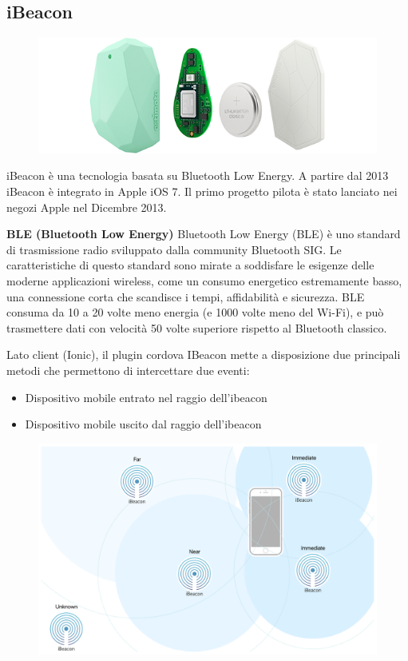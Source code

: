 \subsection{iBeacon}

\begin{figure}[H]
    \centering  
    \includegraphics[scale=0.3]{img/cap2/beacon}
\end{figure}

iBeacon è una tecnologia basata su Bluetooth Low Energy. A partire dal 2013 iBeacon è 
integrato in Apple iOS 7. Il primo progetto pilota è stato lanciato nei negozi Apple nel
Dicembre 2013.

\textbf{BLE (Bluetooth Low Energy)}
Bluetooth Low Energy (BLE) è uno standard di trasmissione radio sviluppato dalla community 
Bluetooth SIG. Le caratteristiche di questo standard sono mirate a soddisfare le esigenze
delle moderne applicazioni wireless, come un consumo energetico estremamente basso, una
connessione corta che scandisce i tempi, affidabilità e sicurezza. 
BLE consuma da 10 a 20 volte meno energia (e 1000 volte meno del Wi-Fi), e può trasmettere
dati con velocità 50 volte superiore rispetto al Bluetooth classico. 

Lato client (Ionic), il plugin cordova IBeacon mette a disposizione due principali metodi
che permettono di intercettare due eventi:

\begin{itemize}
    \item Dispositivo mobile entrato nel raggio dell'ibeacon
    \item Dispositivo mobile uscito dal raggio dell'ibeacon
\end{itemize}

\begin{figure}[H]
    \centering  
    \includegraphics[scale=0.3]{img/cap2/beacon-proximity}
\end{figure}



